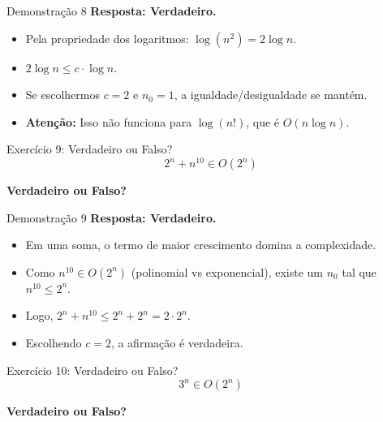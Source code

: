 \documentclass[aspectratio=169]{beamer}
\begin{document}
\begin{frame}{Demonstração 8}
    \textbf{Resposta: Verdadeiro.}
    \begin{itemize}
        \item Pela propriedade dos logaritmos: $\log(n^2) = 2 \log n$.
        \item $2 \log n \le c \cdot \log n$.
        \item Se escolhermos $c = 2$ e $n_0 = 1$, a igualdade/desigualdade se mantém.
        \item \textbf{Atenção:} Isso não funciona para $\log(n!)$, que é $O(n \log n)$.
    \end{itemize}
\end{frame}

\begin{frame}{Exercício 9: Verdadeiro ou Falso?}
    \Large
    \[ 2^n + n^{10} \in O(2^n) \]
    \begin{center}
        \textbf{Verdadeiro ou Falso?}
    \end{center}
\end{frame}

\begin{frame}{Demonstração 9}
    \textbf{Resposta: Verdadeiro.}
    \begin{itemize}
        \item Em uma soma, o termo de maior crescimento domina a complexidade.
        \item Como $n^{10} \in O(2^n)$ (polinomial vs exponencial), existe um $n_0$ tal que $n^{10} \le 2^n$.
        \item Logo, $2^n + n^{10} \le 2^n + 2^n = 2 \cdot 2^n$.
        \item Escolhendo $c=2$, a afirmação é verdadeira.
    \end{itemize}
\end{frame}



\begin{frame}{Exercício 10: Verdadeiro ou Falso?}
    \centering
    \Large
    \[ 3^n \in O(2^n) \]
    
    \vspace{1cm}
    
    \textbf{Verdadeiro ou Falso?}
\end{frame}
\end{document}
